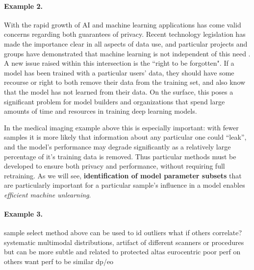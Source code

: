 \paragraph{Example 2.}
With the rapid growth of AI and machine learning applications has come valid concerns regarding both guarantees of privacy.
Recent technology legislation has made the importance clear in all aspects of data use,
and particular projects and groups have demonstrated that machine learning is not independent of
this need \citep{Exposing}.
A new issue raised within this intersection is the ``right to be forgotten".
If a model has been trained with a particular users' data, 
they should have some recourse or right
to both remove their data from the training set,
and also know that the model has not learned from their data.
On the surface, this poses a significant problem for model builders
and organizations that spend large amounts
of time and resources in 
training deep learning models.

In the medical imaging example above this is especially important: with fewer samples it is more likely that information about any particular one could ``leak'', and the model's performance may degrade significantly as a relatively large percentage of it's training data is removed.
Thus particular methods must be developed to ensure both privacy and performance, without requiring full retraining.
As we will see, 
\textbf{identification of model parameter subsets}
that are particularly important
for a particular sample's influence
in a model enables \textit{efficient machine unlearning}.

\paragraph{Example 3.}
    sample select
    method above can be used to id outliers
    what if others correlate?
    systematic multimodal distributions,
    artifact of different scanners or procedures
    but can be more subtle and related to protected
    altas eurocentric poor perf on others
    want perf to be similar
    dp/eo

